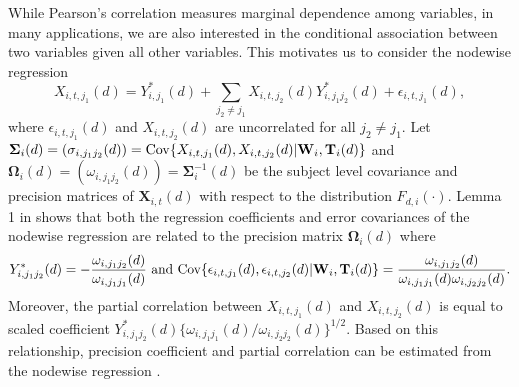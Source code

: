\documentclass[12pt]{article}
\def\be{\begin{equation}}
\def\ee{\end{equation}}
\def\T{{ \mathrm{\scriptscriptstyle T} }}
\theoremstyle{definition}
\newcommand{\cov}{{\rm Cov}}
\newcommand{\bB}{{\mathbf B}}
\newcommand{\bT}{{\mathbf T}}
\newcommand{\bW}{{\mathbf W}}
\newcommand{\bX}{{\mathbf X}}
\newcommand{\bOmega}{\boldsymbol{\Omega}}
\newcommand{\bSigma}{\boldsymbol{\Sigma}}
\newcommand{\bgamma}{\boldsymbol{\gamma}}
\begin{document}
While Pearson's correlation measures marginal dependence among variables, in many applications, we are also interested in the conditional association between two variables given all other variables. This motivates us to consider the nodewise regression \citep{meinshausen2006high}
\be
X_{i, t, j_1}(d) = Y^{\ast}_{i, j_1}(d) + 
\sum_{j_2 \neq j_1} X_{i, t, j_2}(d) Y^{\ast}_{i, j_1j_2}(d) + \epsilon_{i, t, j_1}(d),
\label{eq:Example2}\ee
where $\epsilon_{i, t, j_1}(d)$ and $X_{i, t, j_2}(d)$ are uncorrelated for all $j_2 \neq j_1$.
Let $\bSigma_i(d) = (\sigma_{i, j_1j_2}(d)) = {\cov}\{X_{i, t, j_1}(d), X_{i, t, j_2}(d) | \bW_i, \bT_i(d) \}$ and $\bOmega_{i}(d) = (\omega_{i, j_1j_2}(d)) = \bSigma_{i}^{-1}(d)$ be the subject level covariance and precision matrices of $\bX_{i, t}(d)$ with respect to the distribution $F_{d, i}(\cdot)$. 
Lemma 1 in \cite{peng2009partial} shows that both the regression coefficients and error covariances of the nodewise regression are related to the precision matrix $\bOmega_{i}(d)$ where
$$Y^{\ast}_{i, j_1j_2}(d) = - \frac{\omega_{i, j_1j_2}(d)}{\omega_{i, j_1j_1}(d)} \ \mbox{and} \  {\cov}\{\epsilon_{i, t, j_1}(d), \epsilon_{i, t, j_2}(d) | \bW_i, \bT_i(d)\} = \frac{\omega_{i, j_1j_2}(d)}{\omega_{i, j_1j_1}(d)\omega_{i, j_2j_2}(d)}.$$
Moreover, the partial correlation between $X_{i, t, j_1}(d)$ and $X_{i, t, j_2}(d)$ is equal to scaled coefficient $Y^{\ast}_{i, j_1j_2}(d) \{\omega_{i, j_1j_1}(d) / \omega_{i, j_2j_2}(d)\}^{1/2}$.
Based on this relationship, precision coefficient and partial correlation can be estimated from the nodewise regression \citep{qiu2020estimating}.

\end{document}
